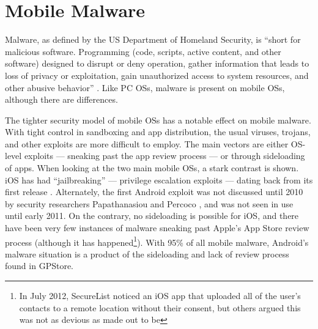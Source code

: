 
\section{Mobile Malware}
Malware, as defined by the US Department of Homeland Security, is ``short for malicious software. Programming (code, scripts, active content, and other software) designed to disrupt or deny operation, gather information that leads to loss of privacy or exploitation, gain unauthorized access to system resources, and other abusive behavior'' \citep{nash2005undirected}. Like PC OSs, malware is present on mobile OSs, although there are differences.


The tighter security model of mobile OSs has a notable effect on mobile malware. With tight control in sandboxing and app distribution, the usual viruses, trojans, and other exploits are more difficult to employ. The main vectors are either OS-level exploits --- sneaking past the app review process --- or through sideloading of apps. When looking at the two main mobile OSs, a stark contrast is shown. iOS has had  ``jailbreaking'' --- privilege escalation exploits --- dating back from its first release \citep{damopoulos2011isam}. Alternately, the first Android exploit was not discussed until 2010 by security researchers Papathanasiou and Percoco \citep{papathanasiou2010not}, and was not seen in use until early 2011\citep{castillo2010android}. On the contrary, no sideloading is possible for iOS, and there have been very few instances of malware sneaking past Apple's App Store review process (although it has happened\footnote{In July 2012, SecureList noticed an iOS app that uploaded all of the user's contacts to a remote location without their consent\citep{SecureList2012}, but others argued this was not as devious as made out to be\citep{trendmicroios2012} }). With 95\% of all mobile malware\citep{nq2013}, Android's malware situation is a product of the sideloading and lack of review process found in GPStore\citep{nq2013}. %


